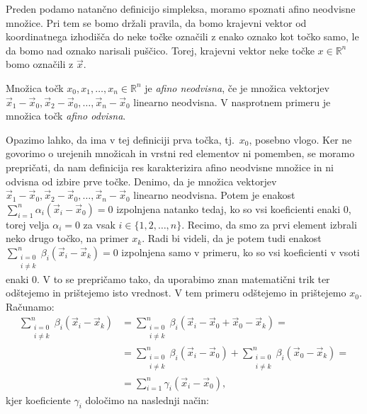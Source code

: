 \documentclass[mat1]{fmfdelo}
\newcommand{\R}{\mathbb R}
\newcommand{\0}{\underline{0}}
\begin{document}
Preden podamo natančno definicijo simpleksa, moramo spoznati afino neodvisne množice. Pri tem se bomo držali pravila, da bomo krajevni vektor od koordinatnega izhodišča do neke točke označili z enako oznako kot točko samo, le da bomo nad oznako narisali puščico. Torej, krajevni vektor neke točke $x \in \R^n$ bomo označili z $\vec{x}$.
\begin{definicija}
Množica točk $x_0, x_1, \dots , x_n \in \R^n$ je \emph{afino neodvisna}, če je množica vektorjev $\vec{x}_1 - \vec{x}_0, \vec{x}_2 - \vec{x}_0, \dots , \vec{x}_n - \vec{x}_0$ linearno neodvisna. V nasprotnem primeru je množica točk \emph{afino odvisna}.
\end{definicija}

Opazimo lahko, da ima v tej definiciji prva točka, tj.\ $x_0$, posebno vlogo. Ker ne govorimo o urejenih množicah in vrstni red elementov ni pomemben, se moramo prepričati, da nam definicija res karakterizira afino neodvisne množice in ni odvisna od izbire prve točke. Denimo, da je množica vektorjev $\vec{x}_1 - \vec{x}_0, \vec{x}_2 - \vec{x}_0, \dots , \vec{x}_n - \vec{x}_0$ linearno neodvisna. Potem je enakost $\sum\limits_{i=1}^n \alpha_i (\vec{x}_i - \vec{x}_0) = 0$ izpolnjena natanko tedaj, ko so vsi koeficienti enaki $0$, torej velja $\alpha_i = 0$ za vsak $i \in \{ 1, 2, \dots, n \}$. Recimo, da smo za prvi element izbrali neko drugo točko, na primer $x_k$. Radi bi videli, da je potem tudi enakost $\sum\limits_{\substack{i=0 \\ i\neq k}}^n \beta_i (\vec{x}_i - \vec{x}_k) = 0$ izpolnjena samo v primeru, ko so vsi koeficienti v vsoti enaki $0$. V to se prepričamo tako, da uporabimo znan matematični trik ter odštejemo in prištejemo isto vrednost. V tem primeru odštejemo in prištejemo $x_0$.
Računamo:
\begin{align*} 
\sum\limits_{\substack{i=0 \\ i \neq k}}^n \beta_i (\vec{x}_i - \vec{x}_k) &=  \sum\limits_{\substack{i=0 \\ i \neq k}}^n \beta_i (\vec{x}_i - \vec{x}_0 + \vec{x}_0 - \vec{x}_k) = \\
&=\sum\limits_{\substack{i=0 \\ i\neq k}}^n \beta_i (\vec{x}_i - \vec{x}_0) + \sum\limits_{\substack{i=0 \\ i\neq k}}^n \beta_i (\vec{x}_0 - \vec{x}_k) =\\
&= \sum\limits_{i=1}^n \gamma_i (\vec{x}_i - \vec{x}_0),
\end{align*}
kjer koeficiente $\gamma_i$ določimo na naslednji način:
\end{document}
